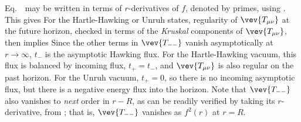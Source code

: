Eq.~\stress\ may be written in terms of $r$-derivatives of $f$, denoted by primes, using \tortdef.  This gives
\eqn{}
For the Hartle-Hawking or Unruh states, regularity of $\vev{T_{\mu\nu}}$ at the future horizon, checked in terms of the {\it Kruskal} components of $\vev{T_{\mu\nu}}$, then implies 
%
\eqn{}
%
Since the other terms in $\vev{T_{--}}$ vanish asymptotically at $r\rightarrow\infty$, $t_-$ is the asymptotic Hawking flux.  For the Hartle-Hawking vacuum, this flux is balanced by incoming flux, $t_+=t_-$, and $\vev{ T_{\mu\nu}}$ is also regular on the past horizon. For the Unruh vacuum, $t_+=0$, so there is no incoming asymptotic flux, but there is a negative energy flux into the horizon.  Note that $\vev{T_{--}}$ also vanishes to {\it next} order in $r-R$, as can be readily verified by taking its $r$-derivative, from \fstress; that is, $\vev{T_{--}}$ vanishes as $f^2(r)$ at $r=R$.

